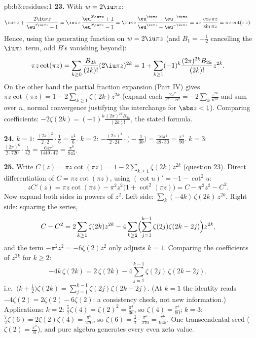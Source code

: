 \begin{solution}{pb:b3:residues:1}
\textbf{23.} With $w = 2\iu\pi z$:
\[
\iu\pi z + \frac{2\iu\pi z}{\eu^{2\iu\pi z} - 1}
= \iu\pi z\,\frac{\eu^{2\iu\pi z} + 1}{\eu^{2\iu\pi z} - 1}
= \iu\pi z\,\frac{\eu^{\iu\pi z} +
\eu^{-\iu\pi z}}{\eu^{\iu\pi z} - \eu^{-\iu\pi z}}
= \pi z\,\frac{\cos\pi z}{\sin\pi z} = \pi z\cot(\pi z) .
\]
Hence, using the generating function on $w = 2\iu\pi z$ (and
$B_1 = -\frac12$ cancelling the $\iu\pi z$ term, odd $B$'s
vanishing beyond):
\[
\pi z\cot(\pi z) = \sum_{k\geq0}\frac{B_{2k}}{(2k)!}
(2\iu\pi z)^{2k}
= 1 + \sum_{k\geq1}(-1)^k\frac{(2\pi)^{2k}B_{2k}}{(2k)!}
z^{2k} .
\]
On the other hand the partial fraction expansion (Part IV)
gives $\pi z\cot(\pi z) = 1 - 2\sum_{k\geq1}\zeta(2k)z^{2k}$
(expand each $\frac{2z^2}{z^2 - n^2} =
-2\sum_k\frac{z^{2k}}{n^{2k}}$ and sum over $n$, normal
convergence justifying the interchange for $\abs z < 1$).
Comparing coefficients: $-2\zeta(2k) =
(-1)^k\frac{(2\pi)^{2k}B_{2k}}{(2k)!}$, the stated formula.

\textbf{24.} $k = 1$: $\frac{(2\pi)^2}{2\cdot2}\cdot\frac16
= \frac{\pi^2}6$. $k = 2$: $-\frac{(2\pi)^4}{2\cdot24}
\cdot\bigl(-\frac1{30}\bigr) = \frac{16\pi^4}{48\cdot30} =
\frac{\pi^4}{90}$. $k = 3$: $\frac{(2\pi)^6}{2\cdot720}
\cdot\frac1{42} = \frac{64\pi^6}{1440\cdot42} =
\frac{\pi^6}{945}$.

\textbf{25.} Write $C(z) = \pi z\cot(\pi z) = 1 -
2\sum_{k\geq1}\zeta(2k)z^{2k}$ (question 23). Direct
differentiation of $C = \pi z\cot(\pi z)$, using $(\cot u)'
= -1 - \cot^2u$:
\[
zC'(z) = \pi z\cot(\pi z) - \pi^2z^2\bigl(1 +
\cot^2(\pi z)\bigr) = C - \pi^2z^2 - C^2 .
\]
Now expand both sides in powers of $z^2$. Left side:
$\sum_k(-4k)\,\zeta(2k)\,z^{2k}$. Right side: squaring the
series,
\[
C - C^2 = 2\sum_{k\geq1}\zeta(2k)z^{2k}
- 4\sum_{k\geq2}\Bigl(\sum_{j=1}^{k-1}\zeta(2j)
\zeta(2k-2j)\Bigr)z^{2k},
\]
and the term $-\pi^2z^2 = -6\zeta(2)z^2$ only adjusts $k =
1$. Comparing the coefficients of $z^{2k}$ for $k \geq 2$:
\[
-4k\,\zeta(2k) = 2\,\zeta(2k) -
4\sum_{j=1}^{k-1}\zeta(2j)\,\zeta(2k-2j),
\]
i.e.\ $\bigl(k + \frac12\bigr)\zeta(2k) =
\sum_{j=1}^{k-1}\zeta(2j)\zeta(2k-2j)$. (At $k = 1$ the
identity reads $-4\zeta(2) = 2\zeta(2) - 6\zeta(2)$: a
consistency check, not new information.) Applications: $k =
2$: $\frac52\zeta(4) = \zeta(2)^2 = \frac{\pi^4}{36}$, so
$\zeta(4) = \frac{\pi^4}{90}$; $k = 3$: $\frac72\zeta(6) =
2\zeta(2)\zeta(4) = \frac{\pi^6}{270}$, so $\zeta(6) =
\frac{2}{7}\cdot\frac{\pi^6}{270} = \frac{\pi^6}{945}$. One
transcendental seed ($\zeta(2) = \frac{\pi^2}6$), and pure
algebra generates every even zeta value.
\end{solution}
